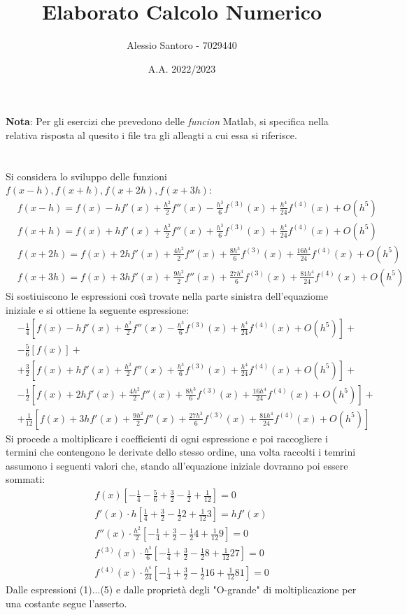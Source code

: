 \documentclass[10pt,a4paper]{article}
\author{Alessio Santoro - 7029440}
\title{Elaborato Calcolo Numerico}
\date{A.A. 2022/2023}
\begin{document}
\maketitle 	
\textbf{Nota}: Per gli esercizi che prevedono delle \textit{funcion} Matlab, si specifica nella relativa risposta al quesito i file tra gli alleagti a cui essa si riferisce.
\section{}
Si considera lo sviluppo delle funzioni $f(x-h), f(x+h), f(x+2h), f(x+3h)$:
\begin{align*}
&f(x-h)=f(x)-hf'(x)+\frac{h^2}{2}f''(x)-\frac{h^3}{6}f^{(3)}(x)+\frac{h^4}{24}f^{(4)}(x)+O(h^5)\\&f(x+h)=f(x)+hf'(x)+\frac{h^2}{2}f''(x)+\frac{h^3}{6}f^{(3)}(x)+\frac{h^4}{24}f^{(4)}(x)+O(h^5)\\&f(x+2h)=f(x)+2hf'(x)+\frac{4h^2}{2}f''(x)+\frac{8h^3}{6}f^{(3)}(x)+\frac{16h^4}{24}f^{(4)}(x)+O(h^5)\\&f(x+3h)=f(x)+3hf'(x)+\frac{9h^2}{2}f''(x)+\frac{27h^3}{6}f^{(3)}(x)+\frac{81h^4}{24}f^{(4)}(x)+O(h^5)
\end{align*}
Si sostiuiscono le espressioni così trovate nella parte sinistra dell'equaziome iniziale e si ottiene la seguente espressione:
\begin{align*}
&-\frac{1}{4}\left[f(x)-hf'(x)+\frac{h^2}{2}f''(x)-\frac{h^3}{6}f^{(3)}(x)+\frac{h^4}{24}f^{(4)}(x)+O(h^5)\right]+\\&-\frac{5}{6}\left[f(x)\right]+\\&+\frac{3}{2}\left[f(x)+hf'(x)+\frac{h^2}{2}f''(x)+\frac{h^3}{6}f^{(3)}(x)+\frac{h^4}{24}f^{(4)}(x)+O(h^5)\right]+\\&-\frac{1}{2}\left[f(x)+2hf'(x)+\frac{4h^2}{2}f''(x)+\frac{8h^3}{6}f^{(3)}(x)+\frac{16h^4}{24}f^{(4)}(x)+O(h^5)\right]+\\&+\frac{1}{12}\left[f(x)+3hf'(x)+\frac{9h^2}{2}f''(x)+\frac{27h^3}{6}f^{(3)}(x)+\frac{81h^4}{24}f^{(4)}(x)+O(h^5)\right]
\end{align*}
Si procede a moltiplicare i coefficienti di ogni espressione e poi raccogliere i termini che contengono le derivate dello stesso ordine, una volta raccolti i temrini assumono i seguenti valori che, stando all'equazione iniziale dovranno poi essere sommati:
\begin{align}
f(x)\left[-\frac{1}{4}-\frac{5}{6}+\frac{3}{2}-\frac{1}{2}+\frac{1}{12}\right]=0\\	f'(x)\cdot h\left[\frac{1}{4}+\frac{3}{2}-\frac{1}{2}2+\frac{1}{12}3\right]=hf'(x)\\f''(x)\cdot\frac{h^2}{2}\left[-\frac{1}{4}+\frac{3}{2}-\frac{1}{2}4+\frac{1}{12}9\right]=0\\f^{(3)}(x)\cdot\frac{h^3}{6}\left[-\frac{1}{4}+\frac{3}{2}-\frac{1}{2}8+\frac{1}{12}27\right]=0\\f^{(4)}(x)\cdot\frac{h^4}{24}\left[-\frac{1}{4}+\frac{3}{2}-\frac{1}{2}16+\frac{1}{12}81\right]=0
\end{align}
Dalle espressioni (1)...(5) e dalle proprietà degli "O-grande" di moltiplicazione per una costante segue l'asserto.
\end{document}

